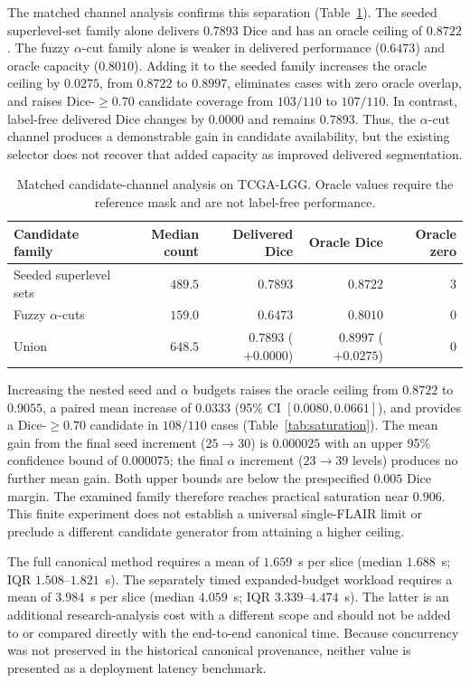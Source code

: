 \documentclass[11pt,a4paper]{article}
\begin{document}
The matched channel analysis confirms this separation (Table~\ref{tab:channel-ablation}).
The seeded superlevel-set family alone delivers $0.7893$ Dice and has an oracle
ceiling of $0.8722$. The fuzzy $\alpha$-cut family alone is weaker in delivered
performance ($0.6473$) and oracle capacity ($0.8010$). Adding it to the seeded
family increases the oracle ceiling by $0.0275$, from $0.8722$ to $0.8997$,
eliminates cases with zero oracle overlap, and raises Dice-$\geq0.70$ candidate
coverage from $103/110$ to $107/110$. In contrast, label-free delivered Dice
changes by $0.0000$ and remains $0.7893$. Thus, the $\alpha$-cut channel produces
a demonstrable gain in candidate availability, but the existing selector does not
recover that added capacity as improved delivered segmentation.

\begin{table}[htbp]\centering
\caption{Matched candidate-channel analysis on TCGA-LGG. Oracle values require
the reference mask and are not label-free performance.}\label{tab:channel-ablation}
\begin{tabular}{lrrrr}
\toprule
Candidate family & Median count & Delivered Dice & Oracle Dice & Oracle zero \\
\midrule
Seeded superlevel sets & $489.5$ & $0.7893$ & $0.8722$ & $3$ \\
Fuzzy $\alpha$-cuts & $159.0$ & $0.6473$ & $0.8010$ & $0$ \\
Union & $648.5$ & $0.7893$ ($+0.0000$) & $0.8997$ ($+0.0275$) & $0$ \\
\bottomrule
\end{tabular}
\end{table}

Increasing the nested seed and $\alpha$ budgets raises the oracle ceiling from
$0.8722$ to $0.9055$, a paired mean increase of $0.0333$ (95\% CI
$[0.0080,0.0661]$), and provides a Dice-$\ge0.70$ candidate in $108/110$ cases
(Table~\ref{tab:saturation}). The mean gain from the final seed increment
($25\rightarrow30$) is $0.000025$ with an upper 95\% confidence bound of
$0.000075$; the final $\alpha$ increment ($23\rightarrow39$ levels) produces no
further mean gain. Both upper bounds are below the prespecified $0.005$ Dice
margin. The examined family therefore reaches practical saturation near $0.906$.
This finite experiment does not establish a universal single-FLAIR limit or
preclude a different candidate generator from attaining a higher ceiling.

The full canonical method requires a mean of $1.659$~s per slice (median
$1.688$~s; IQR $1.508$--$1.821$~s). The separately timed expanded-budget
workload requires a mean of $3.984$~s per slice (median $4.059$~s; IQR
$3.339$--$4.474$~s). The latter is an additional research-analysis cost with a
different scope and should not be added to or compared directly with the
end-to-end canonical time. Because concurrency was not preserved in the
historical canonical provenance, neither value is presented as a deployment
latency benchmark.
\end{document}
